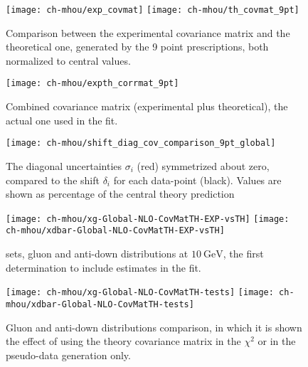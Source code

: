 
\begin{figure}
	\centering
	\texttt{[image: ch-mhou/exp\_covmat]}
	\texttt{[image: ch-mhou/th\_covmat\_9pt]}
	\caption{
		Comparison between the experimental covariance matrix and the
		theoretical one, generated by the 9 point prescriptions, both
		normalized to central values.
	}
	\label{fig:pine/covmats}
\end{figure}

\begin{figure}
	\centering
	\texttt{[image: ch-mhou/expth\_corrmat\_9pt]}
	\caption{
		Combined covariance matrix (experimental plus theoretical), the actual
		one used in the  fit.
	}
	\label{fig:pine/combined-covmat}
\end{figure}

\begin{figure}
	\centering
	\texttt{[image: ch-mhou/shift\_diag\_cov\_comparison\_9pt\_global]}
	\caption{
		The diagonal uncertainties $\sigma_i$ (red) symmetrized about zero,
		compared to the shift $\delta_i$ for each data-point (black).
		Values are shown as percentage of the central theory prediction
	}
	\label{fig:pine/scvar-shifts}
\end{figure}

\begin{figure}
	\centering
	\texttt{[image: ch-mhou/xg-Global-NLO-CovMatTH-EXP-vsTH]}
	\texttt{[image: ch-mhou/xdbar-Global-NLO-CovMatTH-EXP-vsTH]}
	\caption{
		 \nlo sets, gluon and anti-down distributions at
		$\SI{10}{\giga\electronvolt}$, the first \pdf determination to include
		\mhou estimates in the fit.
	}
	\label{fig:pine/3.1th}
\end{figure}

\begin{figure}
	\centering
	\texttt{[image: ch-mhou/xg-Global-NLO-CovMatTH-tests]}
	\texttt{[image: ch-mhou/xdbar-Global-NLO-CovMatTH-tests]}
	\caption{
		Gluon and anti-down distributions comparison, in which it is shown the
		effect of using the theory covariance matrix in the $\chi^2$ or in the
		pseudo-data generation only.
	}
	\label{fig:pine/3.1th-tests}
\end{figure}
